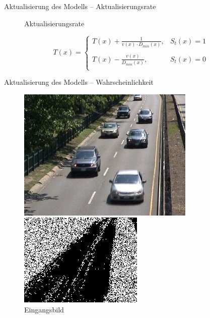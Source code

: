 \documentclass[hyperref={pdfpagelabels=false}]{beamer}
\begin{document}
\begin{frame}[t]{Aktualisierung des Modells -- Aktualisierungsrate}
\begin{figure}
\begin{minipage}{0.45\linewidth}
			\caption*{Aktualisierungsrate}
		\end{minipage}
	\end{figure}
	\bigskip
	\begin{equation*}
		T(x)= 	\left\{
				\begin{array}{ll} 
					T(x) + \frac{1}{v(x)\cdot D_{min}(x)}, &  S_t(x) = 1 \\
					\\
					T(x) - \frac{v(x)}{D_{min}(x)}, &  S_t(x) = 0 \\
				\end{array}
			\right .
	\end{equation*}
\end{frame}

\begin{frame}[t]{Aktualisierung des Modells -- Wahrscheinlichkeit}
	\vspace{1.65em}
	\begin{figure}
		\centering
		\begin{minipage}{0.45\linewidth}
			\includegraphics[width=1\linewidth]{Abbildungen/Eingang3.jpg}
			\caption*{Eingangsbild}
		\end{minipage}
		\begin{minipage}{0.45\linewidth}
			\includegraphics[width=1\linewidth]{Abbildungen/update_array.jpg}

\end{minipage}
\end{figure}
\end{frame}
\end{document}
